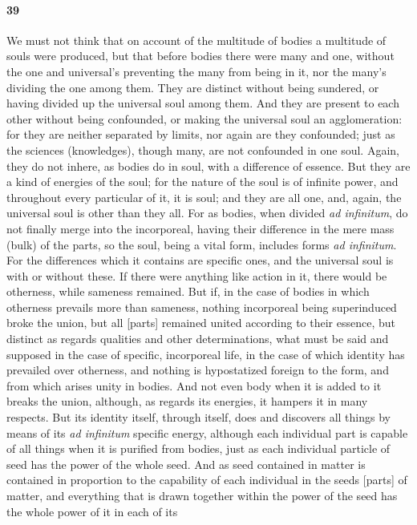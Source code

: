 \documentclass[12pt]{article}
\begin{document}
\paragraph{39} We must not think that on account of the multitude of bodies a
multitude of souls were produced, but that before bodies there were many and
one, without the one and universal's preventing the many from being in it, nor
the many's dividing the one among them. They are distinct without being
sundered, or having divided up the universal soul among them. And they are
present to each other without being confounded, or making the universal soul an
agglomeration: for they are neither separated by limits, nor again are they
confounded; just as the sciences (knowledges), though many, are not confounded
in one soul. Again, they do not inhere, as bodies do in soul, with a difference
of essence. But they are a kind of energies of the soul; for the nature of the
soul is of infinite power, and throughout every particular of it, it is soul;
and they are all one, and, again, the universal soul is other than they all.
For as bodies, when divided \textit{ad infinitum}, do not finally merge into
the incorporeal, having their difference in the mere mass (bulk) of the parts,
so the soul, being a vital form, includes forms \textit{ad infinitum}. For the
differences which it contains are specific ones, and the universal soul is with
or without these. If there were anything like action in it, there would be
otherness, while sameness remained. But if, in the case of bodies in which
otherness prevails more than sameness, nothing incorporeal being superinduced
broke the union, but all [parts] remained united according to their essence,
but distinct as regards qualities and other determinations, what must be said
and supposed in the case of specific, incorporeal life, in the case of which
identity has prevailed over otherness, and nothing is hypostatized foreign to
the form, and from which arises unity in bodies. And not even body when it is
added to it breaks the union, although, as regards its energies, it hampers it
in many respects. But its identity itself, through itself, does and discovers
all things by means of its \textit{ad infinitum} specific energy, although each
individual part is capable of all things when it is purified from bodies, just
as each individual particle of seed has the power of the whole seed. And as
seed contained in matter is contained in proportion to the capability of each
individual in the seeds [parts] of matter, and everything that is drawn
together within the power of the seed has the whole power of it in each of its
\end{document}
